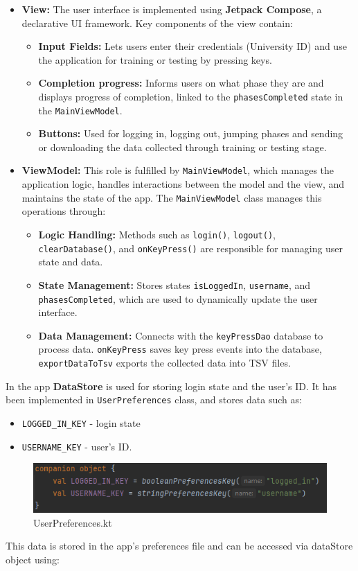 \begin{itemize}
	\item \textbf{View:} The user interface is implemented using \textbf{Jetpack Compose}, a declarative UI framework. Key components of the view contain:
	\begin{itemize}
		\item \textbf{Input Fields:} Lets users enter their credentials (University ID) and use the application for training or testing by pressing keys. 
		\item \textbf{Completion progress:} Informs users on what phase they are and displays progress of completion, linked to the \texttt{phasesCompleted} state in the \texttt{MainViewModel}.
		\item \textbf{Buttons:} Used for logging in, logging out, jumping phases and sending or downloading the data collected through training or testing stage.
	\end{itemize}
	\item \textbf{ViewModel:} This role is fulfilled by \texttt{MainViewModel}, which manages the application logic, handles interactions between the model and the view, and maintains the state of the app. \newline
	The \texttt{MainViewModel} class manages this operations through:
	\begin{itemize}
		\item \textbf{Logic Handling:} Methods such as \texttt{login()}, \texttt{logout()}, \texttt{clearDatabase()}, and \texttt{onKeyPress()} are responsible for managing user state and data.
		\item \textbf{State Management:} Stores states \texttt{isLoggedIn}, \texttt{username}, and \texttt{phasesCompleted}, which are used to dynamically update the user interface.
		\item \textbf{Data Management:} Connects with the \texttt{keyPressDao} database to process data. \texttt{onKeyPress} saves key press events into the database, \texttt{exportDataToTsv} exports the collected data into TSV files.
	\end{itemize}
\end{itemize}
In the app \textbf{DataStore} is used for storing login state and the user's ID. It has been implemented in \texttt{UserPreferences} class, and stores data such as:
\begin{itemize}
	\item \texttt{LOGGED\_IN\_KEY} - login state
	\item \texttt{USERNAME\_KEY} - user's ID.
\end{itemize}
\begin{figure}[H]
	\centering
	\includegraphics[width=0.8\linewidth]{images/CompanionObject.png}
	\caption{UserPreferences.kt}
	\label{fig:companion_object_view}
\end{figure}
This data is stored in the app's preferences file and can be accessed via dataStore object using:

